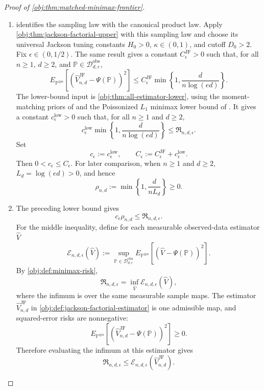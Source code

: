 \begin{proof}[Proof of \cref{obj:thm:matched-minimax-frontier}]
\begin{enumerate}
\item {} identifies the sampling law with the canonical product law.  Apply \cref{obj:thm:jackson-factorial-upper} with this sampling law and choose its universal Jackson tuning constants \(H_0>0\), \(\kappa\in(0,1)\), and cutoff \(D_0>2\).  Fix \(\epsilon\in(0,1/2)\).  The same result gives a constant \(C_{\epsilon}^{\mathrm{JF}}>0\) such that, for all \(n\ge1\), \(d\ge2\), and \(\mathbb P\in\mathcal D_{d,\epsilon}^{\mathrm{obs}}\),
\[
E_{\mathbb P^{\otimes n}}
\left[
  \left(\widehat V_{n,d}^{\mathrm{JF}}-\Psi(\mathbb P)\right)^2
\right]
\le
C_{\epsilon}^{\mathrm{JF}}
\min\left\{1,\frac{d}{n\log(ed)}\right\}.
\]
The lower-bound input is \cref{obj:thm:all-estimator-lower}, using the moment-matching priors of \citep[Lemma 1 and Section 3.1]{CaiLow2011L1} and the Poissonized \(L_1\) minimax lower bound of \citep[Theorem 3 and equation (24)]{JiaoHanWeissman2018L1}.  It gives a constant \(c_{\epsilon}^{\mathrm{low}}>0\) such that, for all \(n\ge1\) and \(d\ge2\),
\[
c_{\epsilon}^{\mathrm{low}}
\min\left\{1,\frac{d}{n\log(ed)}\right\}
\le
\mathfrak R_{n,d,\epsilon}.
\]
Set
\[
c_\epsilon:=c_{\epsilon}^{\mathrm{low}},
\qquad
C_\epsilon:=C_{\epsilon}^{\mathrm{JF}}+c_{\epsilon}^{\mathrm{low}} .
\]
Then \(0<c_\epsilon\le C_\epsilon\).  For later comparison, when \(n\ge1\) and \(d\ge2\), \(L_d=\log(ed)>0\), and hence
\[
\rho_{n,d}:=
\min\left\{1,\frac{d}{nL_d}\right\}\ge0 .
\]

\item The preceding lower bound gives
\[
c_\epsilon\rho_{n,d}\le \mathfrak R_{n,d,\epsilon}.
\]
For the middle inequality, define for each measurable observed-data estimator \(\widehat V\)
\[
\mathcal E_{n,d,\epsilon}(\widehat V)
:=
\sup_{\mathbb P\in\mathcal D_{d,\epsilon}^{\mathrm{obs}}}
E_{\mathbb P^{\otimes n}}
\left[
  \left(\widehat V-\Psi(\mathbb P)\right)^2
\right].
\]
By \cref{obj:def:minimax-risk},
\[
\mathfrak R_{n,d,\epsilon}
=
\inf_{\widehat V}\mathcal E_{n,d,\epsilon}(\widehat V),
\]
where the infimum is over the same measurable sample maps.  The estimator \(\widehat V_{n,d}^{\mathrm{JF}}\) in \cref{obj:def:jackson-factorial-estimator} is one admissible map, and squared-error risks are nonnegative:
\[
E_{\mathbb P^{\otimes n}}
\left[
  \left(\widehat V_{n,d}^{\mathrm{JF}}-\Psi(\mathbb P)\right)^2
\right]\ge0 .
\]
Therefore evaluating the infimum at this estimator gives
\[
\mathfrak R_{n,d,\epsilon}
\le
\mathcal E_{n,d,\epsilon}(\widehat V_{n,d}^{\mathrm{JF}}).
\]


\end{enumerate}
\end{proof}
